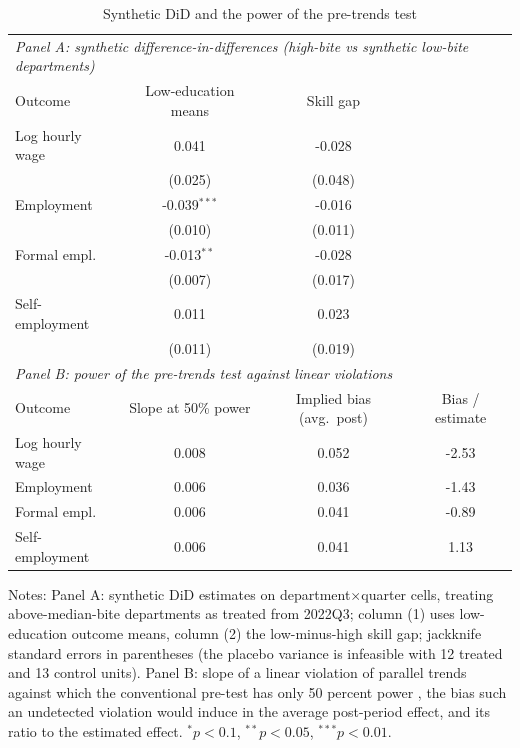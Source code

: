 \begin{table}[!tbp]\centering
\caption{Synthetic DiD and the power of the pre-trends test}\label{tab:sdidpower}
\begin{threeparttable}
\footnotesize
\begin{tabular}{lccc}
\toprule
\multicolumn{4}{l}{\emph{Panel A: synthetic difference-in-differences (high-bite vs synthetic low-bite departments)}}\\
Outcome & Low-education means & Skill gap & \\
\midrule
Log hourly wage & 0.041 & -0.028 & \\
 & (0.025) & (0.048) & \\
Employment & -0.039$^{***}$ & -0.016 & \\
 & (0.010) & (0.011) & \\
Formal empl. & -0.013$^{**}$ & -0.028 & \\
 & (0.007) & (0.017) & \\
Self-employment & 0.011 & 0.023 & \\
 & (0.011) & (0.019) & \\
\midrule
\multicolumn{4}{l}{\emph{Panel B: power of the pre-trends test against linear violations \citep{roth_2022_pretest}}}\\
Outcome & Slope at 50\% power & Implied bias (avg.\ post) & Bias / estimate \\ \midrule
Log hourly wage & 0.008 & 0.052 & -2.53 \\
Employment & 0.006 & 0.036 & -1.43 \\
Formal empl. & 0.006 & 0.041 & -0.89 \\
Self-employment & 0.006 & 0.041 & 1.13 \\
\bottomrule
\end{tabular}
\begin{tablenotes}\footnotesize
\item Notes: Panel A: synthetic DiD estimates \citep{arkhangelsky_2021_sdid} on department$\times$quarter cells, treating above-median-bite departments as treated from 2022Q3; column (1) uses low-education outcome means, column (2) the low-minus-high skill gap; jackknife standard errors in parentheses (the placebo variance is infeasible with 12 treated and 13 control units). Panel B: slope of a linear violation of parallel trends against which the conventional pre-test has only 50 percent power \citep{roth_2022_pretest}, the bias such an undetected violation would induce in the average post-period effect, and its ratio to the estimated effect. $^{*}p<0.1$, $^{**}p<0.05$, $^{***}p<0.01$.
\end{tablenotes}
\end{threeparttable}\end{table}
